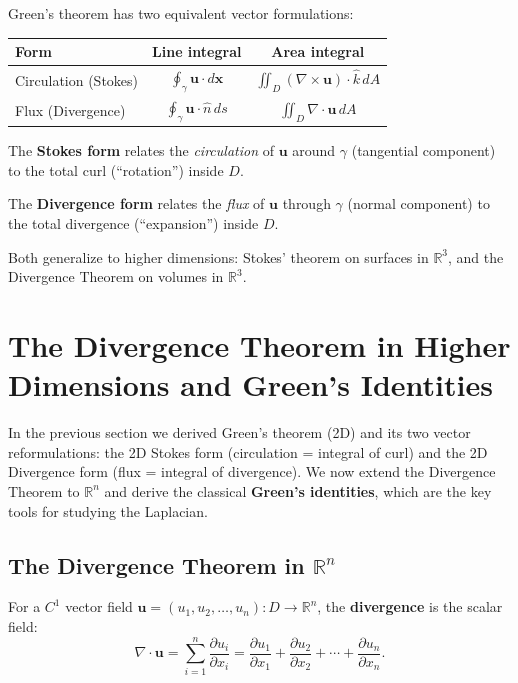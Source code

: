 \documentclass[11pt]{report}
\newcommand{\R}{\mathbb{R}}
\newcommand{\parti}[2]{\frac{\partial #1}{\partial #2}}
\begin{document}
\begin{remark}
Green's theorem has two equivalent vector formulations:

\begin{center}
\renewcommand{\arraystretch}{1.5}
\begin{tabular}{|l|c|c|}
\hline
\textbf{Form} & \textbf{Line integral} & \textbf{Area integral} \\
\hline
Circulation (Stokes) & $\oint_\gamma \mathbf{u} \cdot d\mathbf{x}$ & $\iint_D (\nabla \times \mathbf{u}) \cdot \hat{k} \, dA$ \\
\hline
Flux (Divergence) & $\oint_\gamma \mathbf{u} \cdot \hat{n} \, ds$ & $\iint_D \nabla \cdot \mathbf{u} \, dA$ \\
\hline
\end{tabular}
\end{center}

The \textbf{Stokes form} relates the \textit{circulation} of $\mathbf{u}$ around $\gamma$ (tangential component) to the total curl (``rotation'') inside $D$.

The \textbf{Divergence form} relates the \textit{flux} of $\mathbf{u}$ through $\gamma$ (normal component) to the total divergence (``expansion'') inside $D$.

Both generalize to higher dimensions: Stokes' theorem on surfaces in $\R^3$, and the Divergence Theorem on volumes in $\R^3$.
\end{remark}

\section{The Divergence Theorem in Higher Dimensions and Green's Identities}

In the previous section we derived Green's theorem (2D) and its two vector reformulations: the 2D Stokes form (circulation = integral of curl) and the 2D Divergence form (flux = integral of divergence). We now extend the Divergence Theorem to $\R^n$ and derive the classical \textbf{Green's identities}, which are the key tools for studying the Laplacian.

\subsection{The Divergence Theorem in $\R^n$}

\begin{definition}[Divergence in $\R^n$]
For a $C^1$ vector field $\mathbf{u} = (u_1, u_2, \ldots, u_n): D \to \R^n$, the \textbf{divergence} is the scalar field:
\[
\nabla \cdot \mathbf{u} = \sum_{i=1}^n \parti{u_i}{x_i} = \parti{u_1}{x_1} + \parti{u_2}{x_2} + \cdots + \parti{u_n}{x_n}.
\]
\end{definition}
\end{document}
